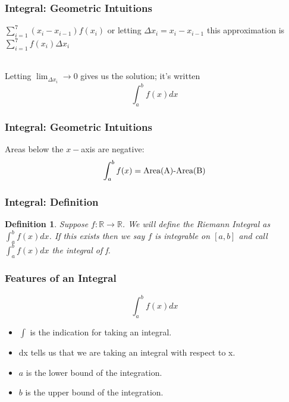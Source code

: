\documentclass{beamer}
\newtheorem{defn}{Definition}
\numberwithin{equation}{section}
\begin{document}
\begin{frame}
\frametitle{Integral: Geometric Intuitions}

\begin{center}
\end{center}
  
$\sum_{i=1}^7 (x_i-x_{i-1})f(x_i)$  or letting $\Delta x_i=x_i-x_{i-1}$ this approximation is
$\sum_{i=1}^7 f(x_i) \Delta x_i$ \pause

\ \\Letting $\lim_{\Delta x_i}\rightarrow 0$ gives us the solution; it's written $$\int_a^b f(x) dx$$

\end{frame}



\begin{frame}
\frametitle{Integral: Geometric Intuitions}

Areas below the $x-$axis are negative: $$\int_a^b f(x)=\hbox{Area(A)-Area(B)}$$
  
\begin{center}
\end{center}

\end{frame}



\begin{frame}
\frametitle{Integral: Definition}

\begin{defn} Suppose $f:\mathbb{R} \rightarrow \mathbb{R}$.  We will define the Riemann Integral as $\int_{a}^{b} f(x) dx$.  If this exists then we say $f$ is \alert{integrable} on $[a,b]$ and call $\int_{a}^{b} f(x) dx$ the \alert{integral} of f.  
\end{defn}

\end{frame}



\begin{frame}
\frametitle{Features of an Integral}

$$\int_{a}^{b} f(x) dx$$

\begin{itemize} 
\item $\int$ is the indication for taking an integral.
\item dx tells us that we are taking an integral with respect to x.
\item $a$ is the lower bound of the integration.
\item $b$ is the upper bound of the integration.
\end{itemize}

\end{frame}
\end{document}
